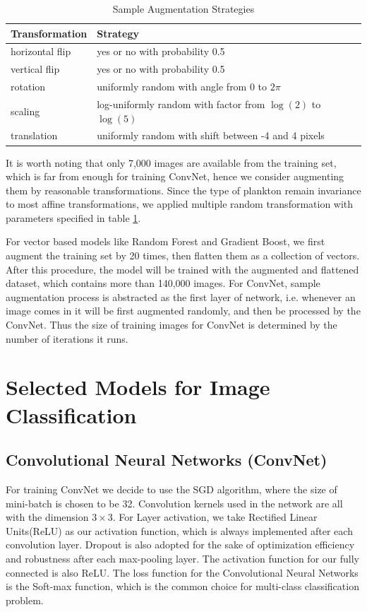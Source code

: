 \documentclass[11pt,oneside,a4paper]{article}
\numberwithin{equation}{section}
\begin{document}
\begin{table}[ht!]
\centering
\small
\caption{Sample Augmentation Strategies}
\begin{tabular}{ll}
\toprule
 Transformation & Strategy\\
 \midrule
 horizontal flip & yes or no with probability 0.5\\
 vertical flip & yes or no with probability 0.5 \\
 rotation & uniformly random with angle from 0 to $2\pi$ \\
 scaling & log-uniformly random with factor from $\log(2)$ to $\log(5)$\\
 translation & uniformly random with shift between -4 and 4 pixels \\
\bottomrule
\end{tabular}
\label{tab:trans}
\end{table}

It is worth noting that only 7,000 images are available from the training set, which is far from enough for training ConvNet, hence we consider augmenting them by reasonable transformations. Since the type of plankton remain invariance to most affine transformations, we applied multiple random transformation with parameters specified in table \ref{tab:trans}.

For vector based models like Random Forest and Gradient Boost, we first augment the training set by 20 times, then flatten them as a collection of vectors. After this procedure, the model will be trained with the augmented and flattened dataset, which contains more than 140,000 images. For ConvNet, sample augmentation process is abstracted as the first layer of network, i.e. whenever an image comes in it will be first augmented randomly, and then be processed by the ConvNet. Thus the size of training images for ConvNet is determined by the number of iterations it runs.

\section{Selected Models for Image Classification}
\subsection{Convolutional Neural Networks (ConvNet)}
For training ConvNet we decide to use the SGD algorithm, where the size of mini-batch is chosen to be 32. Convolution kernels used in the network are all with the dimension $3 \times 3$. For Layer activation, we take Rectified Linear Units(ReLU) as our activation function, which is always implemented after each convolution layer. Dropout is also adopted for the sake of optimization efficiency and robustness after each max-pooling layer. The activation function for our fully connected is also ReLU. The loss function for the Convolutional Neural Networks is the Soft-max function, which is the common choice for multi-class classification problem.
\end{document}
